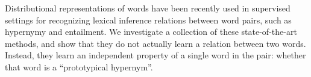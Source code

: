 Distributional representations of words have been recently used in supervised settings for recognizing lexical inference relations between word pairs, such as hypernymy and entailment. We investigate a collection of these state-of-the-art methods, and show that they do not actually learn a relation between two words. Instead, they learn an independent property of a single word in the pair: whether that word is a ``prototypical hypernym''.
